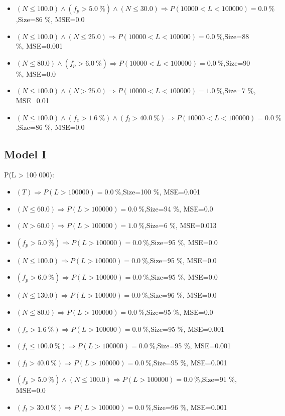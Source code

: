 \documentclass[numbered]{CSL}
\begin{document}
\begin{itemize}
\item $(N \leq 100.0) \land (f_p > 5.0~\%) \land (N \leq 30.0) \Rightarrow P(10 000 < L < 100 000) = 0.0~\%$,\hfill Size=86 \%, MSE=0.0
\item $(N \leq 100.0) \land (N \leq 25.0) \Rightarrow P(10 000 < L < 100 000) = 0.0~\%$,\hfill Size=88 \%, MSE=0.001
\item $(N \leq 80.0) \land (f_p > 6.0~\%) \Rightarrow P(10 000 < L < 100 000) = 0.0~\%$,\hfill Size=90 \%, MSE=0.0
\item $(N \leq 100.0) \land (N > 25.0) \Rightarrow P(10 000 < L < 100 000) = 1.0~\%$,\hfill Size=7 \%, MSE=0.01
\item $(N \leq 100.0) \land (f_c > 1.6~\%) \land (f_l > 40.0~\%) \Rightarrow P(10 000 < L < 100 000) = 0.0~\%$,\hfill Size=86 \%, MSE=0.0
\end{itemize}

\subsection{Model I}
P(L > 100 000):
\begin{itemize}
\item $(T) \Rightarrow P(L > 100 000) = 0.0~\%$,\hfill Size=100 \%, MSE=0.001
\item $(N \leq 60.0) \Rightarrow P(L > 100 000) = 0.0~\%$,\hfill Size=94 \%, MSE=0.0
\item $(N > 60.0) \Rightarrow P(L > 100 000) = 1.0~\%$,\hfill Size=6 \%, MSE=0.013
\item $(f_p > 5.0~\%) \Rightarrow P(L > 100 000) = 0.0~\%$,\hfill Size=95 \%, MSE=0.0
\item $(N \leq 100.0) \Rightarrow P(L > 100 000) = 0.0~\%$,\hfill Size=95 \%, MSE=0.0
\item $(f_p > 6.0~\%) \Rightarrow P(L > 100 000) = 0.0~\%$,\hfill Size=95 \%, MSE=0.0
\item $(N \leq 130.0) \Rightarrow P(L > 100 000) = 0.0~\%$,\hfill Size=96 \%, MSE=0.0
\item $(N \leq 80.0) \Rightarrow P(L > 100 000) = 0.0~\%$,\hfill Size=95 \%, MSE=0.0
\item $(f_c > 1.6~\%) \Rightarrow P(L > 100 000) = 0.0~\%$,\hfill Size=95 \%, MSE=0.001
\item $(f_i \leq 100.0~\%) \Rightarrow P(L > 100 000) = 0.0~\%$,\hfill Size=95 \%, MSE=0.001
\item $(f_l > 40.0~\%) \Rightarrow P(L > 100 000) = 0.0~\%$,\hfill Size=95 \%, MSE=0.001
\item $(f_p > 5.0~\%) \land (N \leq 100.0) \Rightarrow P(L > 100 000) = 0.0~\%$,\hfill Size=91 \%, MSE=0.0
\item $(f_l > 30.0~\%) \Rightarrow P(L > 100 000) = 0.0~\%$,\hfill Size=96 \%, MSE=0.001
\end{itemize}
\end{document}
